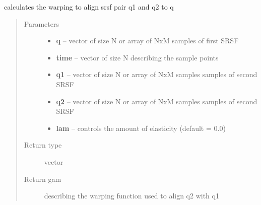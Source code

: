 \documentclass[letterpaper,10pt,english]{sphinxmanual}
\begin{document}

\begin{fulllineitems}
\label{utility_functions:utility_functions.optimum_reparam_pair}
calculates the warping to align srsf pair q1 and q2 to q
\begin{quote}\begin{description}
\item[{Parameters}] \leavevmode\begin{itemize}
\item {} 
\textbf{q} -- vector of size N or array of NxM samples of first SRSF

\item {} 
\textbf{time} -- vector of size N describing the sample points

\item {} 
\textbf{q1} -- vector of size N or array of NxM samples samples of second SRSF

\item {} 
\textbf{q2} -- vector of size N or array of NxM samples samples of second SRSF

\item {} 
\textbf{lam} -- controls the amount of elasticity (default = 0.0)

\end{itemize}

\item[{Return type}] \leavevmode
vector

\item[{Return gam}] \leavevmode
describing the warping function used to align q2 with q1

\end{description}\end{quote}

\end{fulllineitems}

\end{document}
